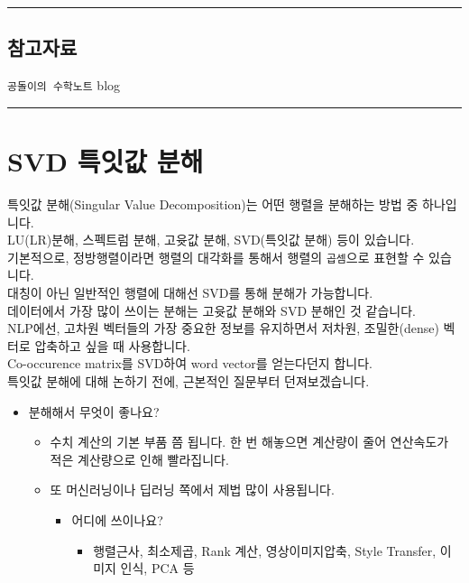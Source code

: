 \documentclass[
]{article}
\providecommand{\tightlist}{%
  \setlength{\itemsep}{0pt}\setlength{\parskip}{0pt}}
\begin{document}
\begin{center}\rule{0.5\linewidth}{0.5pt}\end{center}

\hypertarget{uxcc38uxace0uxc790uxb8cc}{%
\subsection{참고자료}\label{uxcc38uxace0uxc790uxb8cc}}

\texttt{공돌이의\ 수학노트} blog

\begin{center}\rule{0.5\linewidth}{0.5pt}\end{center}

\hypertarget{svd-uxd2b9uxc787uxac12-uxbd84uxd574}{%
\section{SVD 특잇값 분해}\label{svd-uxd2b9uxc787uxac12-uxbd84uxd574}}

특잇값 분해(Singular Value Decomposition)는 어떤 행렬을 분해하는 방법 중
하나입니다.\\
LU(LR)분해, 스펙트럼 분해, 고윳값 분해, SVD(특잇값 분해) 등이
있습니다.\\
기본적으로, 정방행렬이라면 행렬의 대각화를 통해서 행렬의
\texttt{곱셈}으로 표현할 수 있습니다.\\
대칭이 아닌 일반적인 행렬에 대해선 SVD를 통해 분해가 가능합니다.\\
데이터에서 가장 많이 쓰이는 분해는 고윳값 분해와 SVD 분해인 것
같습니다.\\
NLP에선, 고차원 벡터들의 가장 중요한 정보를 유지하면서 저차원,
조밀한(dense) 벡터로 압축하고 싶을 때 사용합니다.\\
Co-occurence matrix를 SVD하여 word vector를 얻는다던지 합니다.\\
특잇값 분해에 대해 논하기 전에, 근본적인 질문부터 던져보겠습니다.

\begin{itemize}
\tightlist
\item
  분해해서 무엇이 좋나요?

  \begin{itemize}
  \tightlist
  \item
    수치 계산의 기본 부품 쯤 됩니다. 한 번 해놓으면 계산량이 줄어
    연산속도가 적은 계산량으로 인해 빨라집니다.
  \item
    또 머신러닝이나 딥러닝 쪽에서 제법 많이 사용됩니다.

    \begin{itemize}
    \tightlist
    \item
      어디에 쓰이나요?

      \begin{itemize}
      \tightlist
      \item
        행렬근사, 최소제곱, Rank 계산, 영상이미지압축, Style Transfer,
        이미지 인식, PCA 등
      \end{itemize}
    \end{itemize}
  \end{itemize}
\end{itemize}
\end{document}

